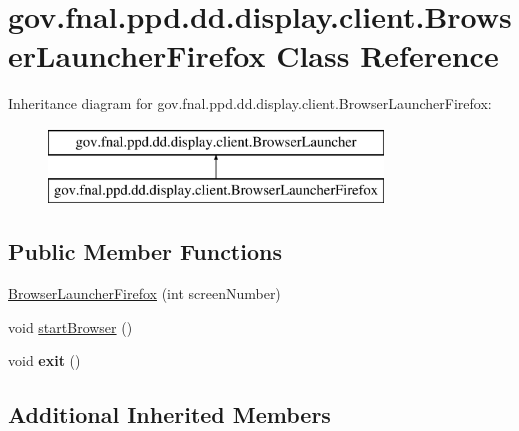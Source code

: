 \hypertarget{classgov_1_1fnal_1_1ppd_1_1dd_1_1display_1_1client_1_1BrowserLauncherFirefox}{\section{gov.\-fnal.\-ppd.\-dd.\-display.\-client.\-Browser\-Launcher\-Firefox Class Reference}
\label{classgov_1_1fnal_1_1ppd_1_1dd_1_1display_1_1client_1_1BrowserLauncherFirefox}
}
Inheritance diagram for gov.\-fnal.\-ppd.\-dd.\-display.\-client.\-Browser\-Launcher\-Firefox\-:\begin{figure}[H]
\begin{center}
\leavevmode
\includegraphics[height=2.000000cm]{classgov_1_1fnal_1_1ppd_1_1dd_1_1display_1_1client_1_1BrowserLauncherFirefox}
\end{center}
\end{figure}
\subsection*{Public Member Functions}
\begin{DoxyCompactItemize}
\item 
\hyperlink{classgov_1_1fnal_1_1ppd_1_1dd_1_1display_1_1client_1_1BrowserLauncherFirefox_aac903afcd864286a8e2edbf2702a8145}{Browser\-Launcher\-Firefox} (int screen\-Number)
\item 
void \hyperlink{classgov_1_1fnal_1_1ppd_1_1dd_1_1display_1_1client_1_1BrowserLauncherFirefox_a6ba586406249c94dc6852c7bf453811f}{start\-Browser} ()
\item 
\hypertarget{classgov_1_1fnal_1_1ppd_1_1dd_1_1display_1_1client_1_1BrowserLauncherFirefox_a3f2c9bdb35552c411499117862f5f625}{void {\bfseries exit} ()}\label{classgov_1_1fnal_1_1ppd_1_1dd_1_1display_1_1client_1_1BrowserLauncherFirefox_a3f2c9bdb35552c411499117862f5f625}

\end{DoxyCompactItemize}
\subsection*{Additional Inherited Members}


